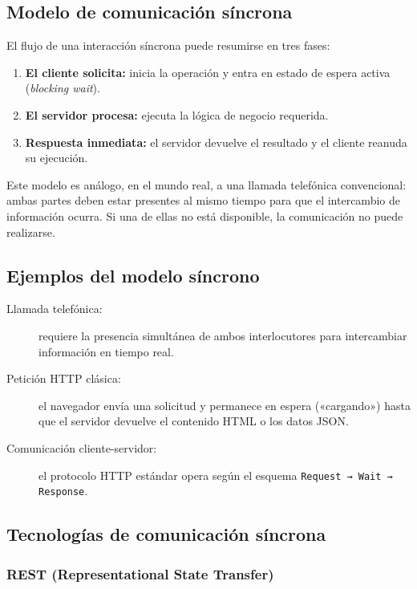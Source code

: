 \documentclass[12pt,a4paper]{article}
\begin{document}
\subsection{Modelo de comunicación síncrona}
 
El flujo de una interacción síncrona puede resumirse en tres fases:
 
\begin{enumerate}
  \item \textbf{El cliente solicita:} inicia la operación y entra en estado de espera activa (\textit{blocking wait}).
  \item \textbf{El servidor procesa:} ejecuta la lógica de negocio requerida.
  \item \textbf{Respuesta inmediata:} el servidor devuelve el resultado y el cliente reanuda su ejecución.
\end{enumerate}
 
Este modelo es análogo, en el mundo real, a una llamada telefónica convencional: ambas partes deben estar presentes al mismo tiempo para que el intercambio de información ocurra. Si una de ellas no está disponible, la comunicación no puede realizarse.
 
\subsection{Ejemplos del modelo síncrono}
 
\begin{description}
  \item[Llamada telefónica:] requiere la presencia simultánea de ambos interlocutores para intercambiar información en tiempo real.
  \item[Petición HTTP clásica:] el navegador envía una solicitud y permanece en espera («cargando») hasta que el servidor devuelve el contenido HTML o los datos JSON.
  \item[Comunicación cliente-servidor:] el protocolo HTTP estándar opera según el esquema \texttt{Request → Wait → Response}.
\end{description}
 
\subsection{Tecnologías de comunicación síncrona}
 
\subsubsection{REST (Representational State Transfer)}
 
\end{document}
